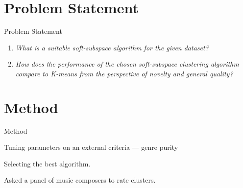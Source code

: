 \documentclass[aspectratio=1610]{beamer}
\begin{document}
\section{Problem Statement}
\begin{frame}{Problem Statement}
\begin{enumerate}
  \item \textit{What is a suitable soft-subspace algorithm for the given dataset?}
  \item \textit{How does the performance of the chosen soft-subspace clustering algorithm compare to K-means from the perspective of novelty and general quality?}
\end{enumerate}
\end{frame}
\section{Method}
\begin{frame}{Method}
\begin{description}
  \item[Method PS 1.] Tuning parameters on an external criteria --- genre purity
  \item \quad Selecting the best algorithm.
  \item[Method PS 2.] Asked a panel of music composers to rate clusters.
\end{description}
\end{frame}
\end{document}
